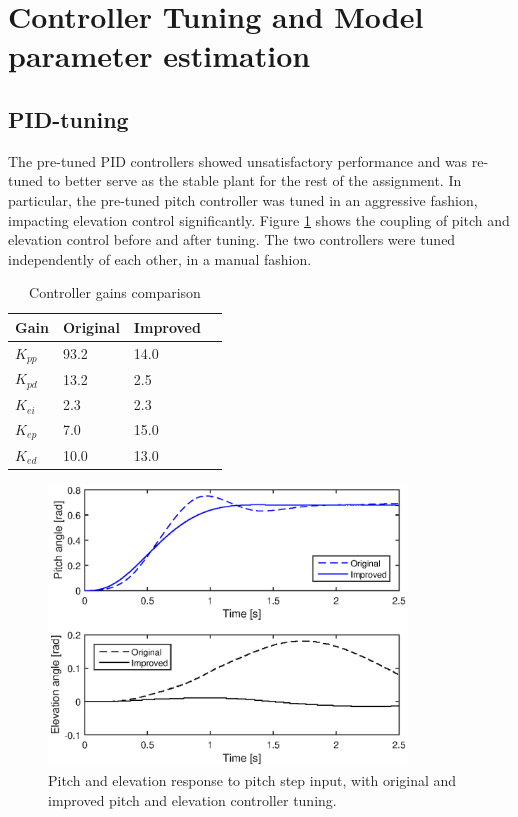\section{Controller Tuning and Model parameter estimation}\label{sec:prob1}
\label{text:problem1}

\subsection{PID-tuning}
The pre-tuned PID controllers showed unsatisfactory performance and was re-tuned to better serve as the stable plant for the rest of the assignment. In particular, the pre-tuned pitch controller was tuned in an aggressive fashion, impacting elevation control significantly. Figure \ref{fig:pid_tuning} shows the coupling of pitch and elevation control before and after tuning. The two controllers were tuned independently of each other, in a manual fashion.

\begin{table}[hp]
	\centering
	\caption{Controller gains comparison}
	\begin{tabular}{llll}
		\hline
		Gain & Original & Improved \\
		\hline
		$K_{pp}$ & 93.2 & 14.0 \\
		$K_{pd}$ & 13.2 & 2.5 \\
		$K_{ei}$ & 2.3 & 2.3 \\
		$K_{ep}$ & 7.0 & 15.0 \\
		$K_{ed}$ & 10.0 & 13.0 \\
	\end{tabular}
	\label{tab:gains}
\end{table}

\begin{figure}[hp]
	\centering
		\includegraphics[width=0.85\textwidth]{figures/1/pid_tuning.eps}
	\caption{Pitch and elevation response to pitch step input, with original and improved pitch and elevation controller tuning.}
	\label{fig:pid_tuning}
\end{figure}



